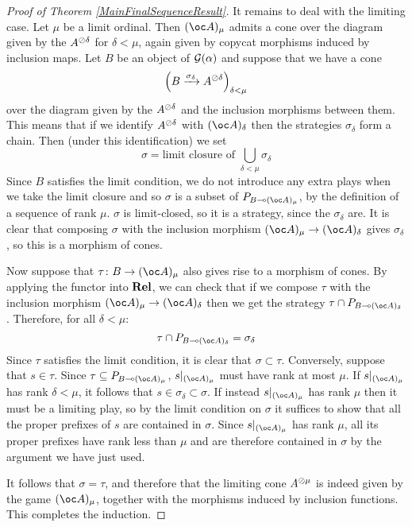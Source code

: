 \documentclass[11pt]{article} %
\begin{document}
\begin{proof}[Proof of Theorem \ref{MainFinalSequenceResult}]
  It remains to deal with the limiting case.  Let $\mu$ be a limit ordinal.  Then $(\oc A)_\mu$ admits a cone over the diagram given by the $A^{\sequoid \delta}$ for $\delta<\mu$, again given by copycat morphisms induced by inclusion maps.  Let $B$ be an object of $\G(\alpha)$ and suppose that we have a cone
  \[
    \left(\map{\sigma_\delta}{B}{A^{\sequoid\delta}}\right)_{\delta<\mu}
    \]
  over the diagram given by the $A^{\sequoid\delta}$ and the inclusion morphisms between them.  This means that if we identify $A^{\sequoid\delta}$ with $(\oc A)_\delta$ then the strategies $\sigma_\delta$ form a chain.  Then (under this identification) we set
  \[
    \sigma = \textrm{limit closure of }\bigcup_{\delta<\mu}\sigma_\delta
    \]
  Since $B$ satisfies the limit condition, we do not introduce any extra plays when we take the limit closure and so $\sigma$ is a subset of $P_{B\implies (\oc A)_\mu}$, by the definition of a sequence of rank $\mu$.  $\sigma$ is limit-closed, so it is a strategy, since the $\sigma_\delta$ are.  It is clear that composing $\sigma$ with the inclusion morphism $(\oc A)_\mu\to(\oc A)_\delta$ gives $\sigma_\delta$, so this is a morphism of cones.  

  Now suppose that $\tau\from B\to(\oc A)_\mu$ also gives rise to a morphism of cones.  By applying the functor into $\Rel$, we can check that if we compose $\tau$ with the inclusion morphism $(\oc A)_\mu\to(\oc A)_\delta$ then we get the strategy $\tau\cap P_{B\implies(\oc A)_\delta}$.  Therefore, for all $\delta<\mu$:
  \[
    \tau \cap P_{B\implies(\oc A)_\delta}=\sigma_\delta
    \]
  Since $\tau$ satisfies the limit condition, it is clear that $\sigma\subset\tau$.  Conversely, suppose that $s\in\tau$.  Since $\tau\subset P_{B\implies(\oc A)_\mu}$, $s\vert_{(\oc A)_\mu}$ must have rank at most $\mu$.  If $s\vert_{(\oc A)_\mu}$ has rank $\delta<\mu$, it follows that $s\in\sigma_\delta\subset\sigma$.  If instead $s\vert_{(\oc A)_\mu}$ has rank $\mu$ then it must be a limiting play, so by the limit condition on $\sigma$ it suffices to show that all the proper prefixes of $s$ are contained in $\sigma$.  Since $s\vert_{(\oc A)_\mu}$ has rank $\mu$, all its proper prefixes have rank less than $\mu$ and are therefore contained in $\sigma$ by the argument we have just used.  

  It follows that $\sigma=\tau$, and therefore that the limiting cone $A^{\sequoid\mu}$ is indeed given by the game $(\oc A)_\mu$, together with the morphisms induced by inclusion functions.  This completes the induction.  
\end{proof}
\end{document}
